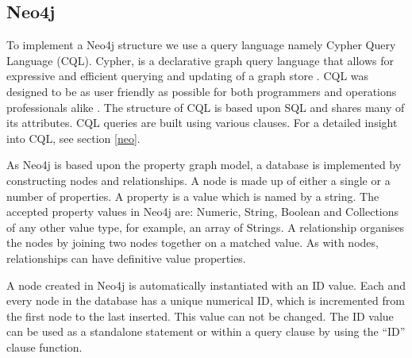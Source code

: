 \subsection{Neo4j}
To implement a Neo4j structure we use a query language namely Cypher Query Language (CQL). Cypher, is a declarative graph query language that allows for expressive and efficient querying and updating of a graph store \cite{nd}. CQL was designed to be as user friendly as possible for both programmers and operations professionals alike \cite{nd}. The structure of CQL is based upon SQL and shares many of its attributes. CQL queries are built using various clauses. For a detailed insight into CQL, see section \ref{neo}.

As Neo4j is based upon the property graph model, a database is implemented by constructing nodes and relationships. A node is made up of either a single or a number of properties. A property is a value which is named by a string. The accepted property values in Neo4j are: Numeric, String, Boolean and Collections of any other value type, for example, an array of Strings. A relationship organises the nodes by joining two nodes together on a matched value. As with nodes, relationships can have definitive value properties.

A node created in Neo4j is automatically instantiated with an ID value. Each and every node in the database has a unique numerical ID, which is incremented from the first node to the last inserted. This value can not be changed. The ID value can be used as a standalone statement or within a query clause by using the ``ID'' clause function.

